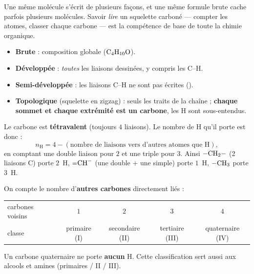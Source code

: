 \documentclass[11pt,a4paper]{article}
\begin{document}

Une même molécule s'écrit de plusieurs façons, et une même formule brute cache parfois plusieurs molécules. Savoir \emph{lire} un squelette carboné --- compter les atomes, classer chaque carbone --- est la compétence de base de toute la chimie organique.

\begin{cle}
\begin{itemize}[leftmargin=1.6em,itemsep=1pt]
  \item \textbf{Brute} : composition globale ($\ce{C4H10O}$).
  \item \textbf{Développée} : \emph{toutes} les liaisons dessinées, y compris les C--H.
  \item \textbf{Semi-développée} : les liaisons C--H ne sont pas écrites ().
  \item \textbf{Topologique} (squelette en zigzag) : seuls les traits de la chaîne ; \textbf{chaque sommet et chaque extrémité est un carbone}, les H sont sous-entendus.
\end{itemize}
\end{cle}

\begin{cle}
Le carbone est \textbf{tétravalent} (toujours $4$ liaisons). Le nombre de H qu'il porte est donc :
\[
n_{\text{H}} = 4 - (\text{nombre de liaisons vers d'autres atomes que H}),
\]
en comptant une double liaison pour $2$ et une triple pour $3$. Ainsi $\ce{-CH2-}$ (2 liaisons C) porte $2$~H, $\ce{=CH-}$ (une double $+$ une simple) porte $1$~H, $\ce{-CH3}$ porte $3$~H.
\end{cle}

\begin{cle}
On compte le nombre d'\textbf{autres carbones} directement liés :
\begin{center}\small
\begin{tabular}{lcccc}
\toprule
carbones voisins & $1$ & $2$ & $3$ & $4$ \\
classe & primaire (I) & secondaire (II) & tertiaire (III) & quaternaire (IV) \\
\bottomrule
\end{tabular}
\end{center}
Un carbone quaternaire ne porte \textbf{aucun} H. Cette classification sert aussi aux alcools et amines (primaires / II / III).
\end{cle}
\end{document}
